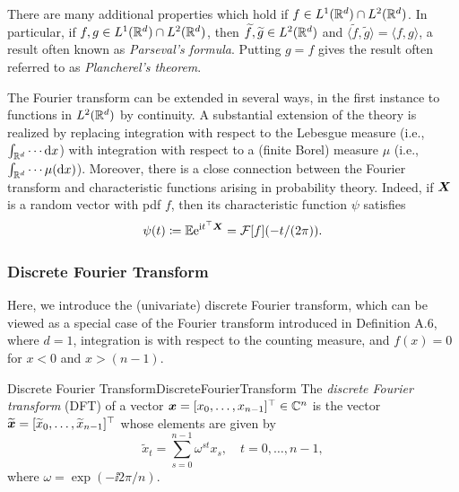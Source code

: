 There are many additional properties which hold if \(f \in L^1(\mathbb{R}^d) \cap L^2(\mathbb{R}^d)\). In particular, if \(f, g \in L^1(\mathbb{R}^d) \cap L^2(\mathbb{R}^d)\), then \(\widetilde{f}, \widetilde{g} \in L^2(\mathbb{R}^d)\) and \(\langle \widetilde{f}, \widetilde{g} \rangle = \langle f, g \rangle\), a result often known as \textit{Parseval's formula}. Putting \(g=f\) gives the result often referred to as \textit{Plancherel's theorem}.

The Fourier transform can be extended in several ways, in the first instance to functions in \(L^2(\mathbb{R}^d)\) by continuity. A substantial extension of the theory is realized by replacing integration with respect to the Lebesgue measure (i.e., \(\int_{\mathbb{R}^d} \cdots \mathrm{d} x\)) with integration with respect to a (finite Borel) measure \(\mu\) (i.e., \(\int_{\mathbb{R}^d} \cdots \mu(\mathrm{d} x)\)). Moreover, there is a close connection between the Fourier transform and characteristic functions arising in probability theory. Indeed, if \(\boldsymbol{X}\) is a random vector with pdf \(f\), then its characteristic function \(\psi\) satisfies
\begin{equation*}
	\psi(t) \coloneqq \mathbb{E} \mathrm{e}^{\mathrm{i} t^\top \boldsymbol{X}} = \mathcal{F}[f](-t/(2\pi)).
\end{equation*}

\subsubsection{Discrete Fourier Transform}
Here, we introduce the (univariate) discrete Fourier transform, which can be viewed as a special case of the Fourier transform introduced in Definition A.6, where \(d=1\), integration is with respect to the counting measure, and \(f(x) = 0\) for \(x < 0\) and \(x > (n-1)\).

\begin{defn}{Discrete Fourier Transform}{DiscreteFourierTransform}
	The \textit{discrete Fourier transform} (DFT) of a vector \(\boldsymbol{x} = [x_0, \dots, x_{n-1}]^\top \in \mathbb{C}^n\) is the vector \(\widetilde{\boldsymbol{x}} = [\widetilde{x}_0, \dots, \widetilde{x}_{n-1}]^\top\) whose elements are given by
	\begin{equation}
		\widetilde{x}_t = \sum_{s=0}^{n-1} \omega^{st} x_s, \quad t = 0, \dots, n-1, \label{eq:DFTDefinition}
	\end{equation}
	where \(\omega = \exp(-\ii 2\pi/n)\).
\end{defn}

